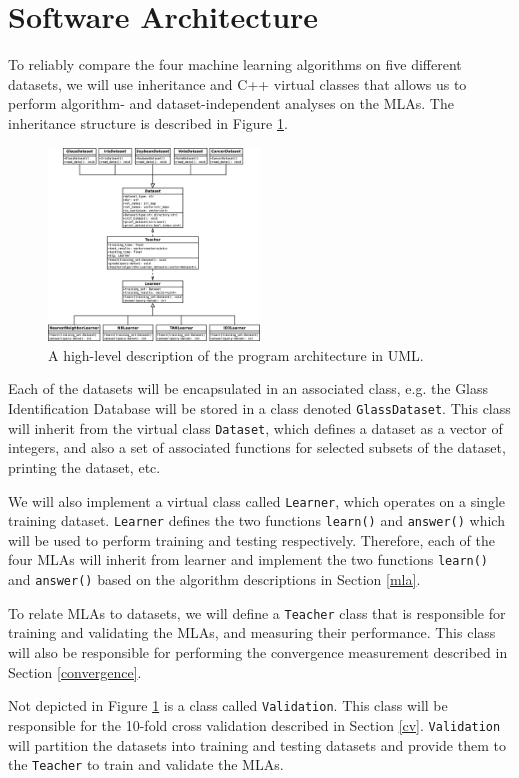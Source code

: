 \documentclass{article}
\begin{document}
	\section{Software Architecture}
		To reliably compare the four machine learning algorithms on five different datasets, we will use inheritance and C++ virtual classes that allows us to perform algorithm- and dataset-independent analyses on the MLAs. The inheritance structure is described in Figure \ref{uml}.
		\begin{figure}[h]
			\centering
			\includegraphics[width=0.5\textwidth]{fig/UML_Design}
			\caption{A high-level description of the program architecture in UML.}
			\label{uml}
		\end{figure}	
		Each of the datasets will be encapsulated in an associated class, e.g. the Glass Identification Database will be stored in a class denoted \texttt{GlassDataset}. This class will inherit from the virtual class \texttt{Dataset}, which defines a dataset as a vector of integers, and also a set of associated functions for selected subsets of the dataset, printing the dataset, etc.
		
		We will also implement a virtual class called \texttt{Learner}, which operates on a single training dataset. \texttt{Learner} defines the two functions \texttt{learn()} and \texttt{answer()} which will be used to perform training and testing respectively. Therefore, each of the four MLAs will inherit from learner and implement the two functions \texttt{learn()} and \texttt{answer()} based on the algorithm descriptions in Section \ref{mla}. 
		
		To relate MLAs to datasets, we will define a \texttt{Teacher} class that is responsible for training and validating the MLAs, and measuring their performance. This class will also be responsible for performing the convergence measurement described in Section \ref{convergence}.
		
		Not depicted in Figure \ref{uml} is a class called \texttt{Validation}. This class will be responsible for the 10-fold cross validation described in Section \ref{cv}. \texttt{Validation} will partition the datasets into training and testing datasets and provide them to the \texttt{Teacher} to train and validate the MLAs.
\end{document}
